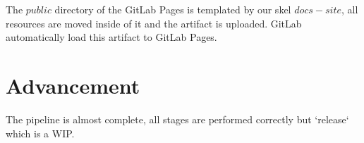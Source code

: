 \documentclass[a4paper,10pt]{scrartcl}
\begin{document}
The $public$ directory of the GitLab Pages is templated by our skel $docs-site$, all resources are moved inside of it and the artifact is uploaded. GitLab automatically load this artifact to GitLab Pages.

\section{Advancement}

The pipeline is almost complete, all stages are performed correctly but `release` which is a WIP.
\end{document}
